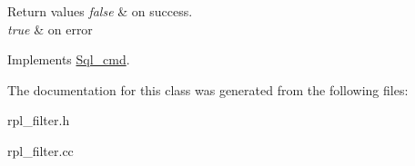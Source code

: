 \begin{DoxyRetVals}{Return values}
{\em false} & on success. \\
\hline
{\em true} & on error \\
\hline
\end{DoxyRetVals}


Implements \mbox{\hyperlink{classSql__cmd_a213367b79b551296fbb7790f2a3732fb}{Sql\+\_\+cmd}}.



The documentation for this class was generated from the following files\+:\begin{DoxyCompactItemize}
\item 
rpl\+\_\+filter.\+h\item 
rpl\+\_\+filter.\+cc\end{DoxyCompactItemize}
